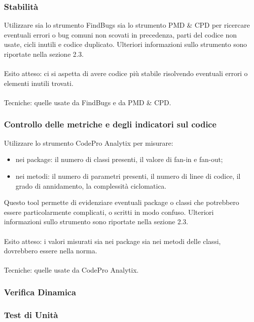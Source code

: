 \subsubsection*{Stabilit\`a}
Utilizzare sia lo strumento FindBugs sia lo strumento PMD \& CPD per ricercare
eventuali errori o bug comuni non scovati in precedenza, parti del codice non
usate, cicli inutili e codice duplicato. Ulteriori informazioni sullo strumento
sono riportate nella sezione 2.3.\\\\ 
Esito atteso: ci si aspetta di avere codice pi\`u stabile risolvendo
eventuali errori o elementi inutili trovati.\\\\ 
Tecniche: quelle usate da FindBugs e da PMD \& CPD.

\subsubsection*{Controllo delle metriche e degli indicatori sul codice}
Utilizzare lo strumento CodePro Analytix per misurare:
\begin{itemize}
  \item nei package: il numero di classi presenti, il valore di fan-in e
  fan-out; 
  \item nei metodi: il numero di parametri presenti, il numero di linee di
  codice, il grado di annidamento, la complessit\`a ciclomatica. 
\end{itemize}
Questo tool permette di evidenziare eventuali package o classi che
potrebbero essere particolarmente complicati, o scritti in modo confuso.
Ulteriori informazioni sullo strumento sono riportate nella sezione 2.3.\\\\ 
Esito atteso: i valori misurati sia nei package sia nei metodi delle
classi, dovrebbero essere nella norma.\\\\ 
Tecniche: quelle usate da CodePro Analytix.

\subsubsection{Verifica Dinamica}

\subsubsection*{Test di Unit\`a}

